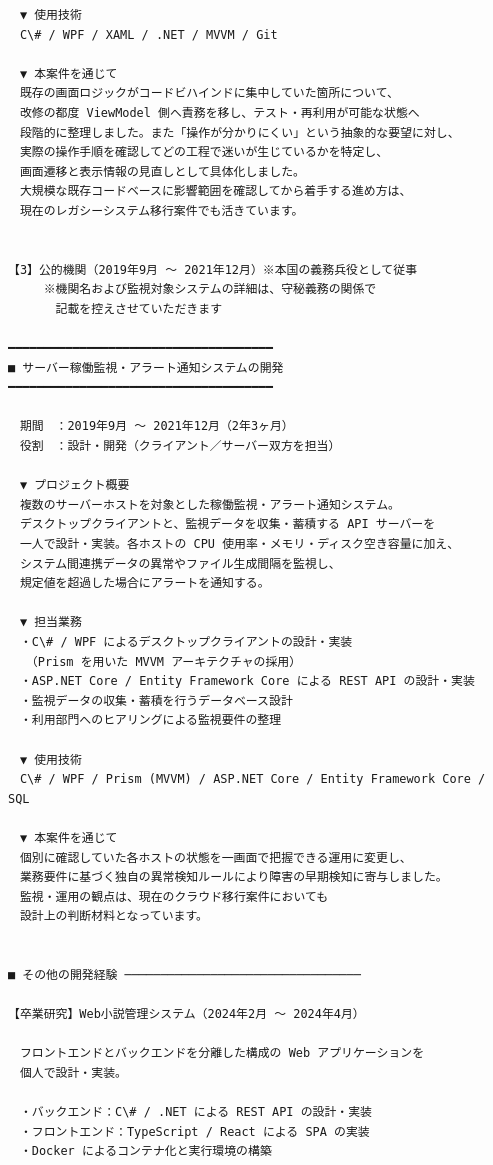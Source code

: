 \documentclass[paper=a4paper,fontsize=9.5pt,head_space=15mm,foot_space=15mm,gutter=18mm,fore_edge=18mm,baselineskip=15.5pt]{jlreq}
\begin{document}
\begin{Verbatim}[fontsize=\small,commandchars=\\\{\}]
　▼ 使用技術
　C\# / WPF / XAML / .NET / MVVM / Git

　▼ 本案件を通じて
　既存の画面ロジックがコードビハインドに集中していた箇所について、
　改修の都度 ViewModel 側へ責務を移し、テスト・再利用が可能な状態へ
　段階的に整理しました。また「操作が分かりにくい」という抽象的な要望に対し、
　実際の操作手順を確認してどの工程で迷いが生じているかを特定し、
　画面遷移と表示情報の見直しとして具体化しました。
　大規模な既存コードベースに影響範囲を確認してから着手する進め方は、
　現在のレガシーシステム移行案件でも活きています。


【3】公的機関（2019年9月 〜 2021年12月）※本国の義務兵役として従事
　　　※機関名および監視対象システムの詳細は、守秘義務の関係で
　　　　記載を控えさせていただきます

━━━━━━━━━━━━━━━━━━━━━━━━━━━━━━━━━━━━━
■ サーバー稼働監視・アラート通知システムの開発
━━━━━━━━━━━━━━━━━━━━━━━━━━━━━━━━━━━━━

　期間　：2019年9月 〜 2021年12月（2年3ヶ月）
　役割　：設計・開発（クライアント／サーバー双方を担当）

　▼ プロジェクト概要
　複数のサーバーホストを対象とした稼働監視・アラート通知システム。
　デスクトップクライアントと、監視データを収集・蓄積する API サーバーを
　一人で設計・実装。各ホストの CPU 使用率・メモリ・ディスク空き容量に加え、
　システム間連携データの異常やファイル生成間隔を監視し、
　規定値を超過した場合にアラートを通知する。

　▼ 担当業務
　・C\# / WPF によるデスクトップクライアントの設計・実装
　　（Prism を用いた MVVM アーキテクチャの採用）
　・ASP.NET Core / Entity Framework Core による REST API の設計・実装
　・監視データの収集・蓄積を行うデータベース設計
　・利用部門へのヒアリングによる監視要件の整理

　▼ 使用技術
　C\# / WPF / Prism (MVVM) / ASP.NET Core / Entity Framework Core / SQL

　▼ 本案件を通じて
　個別に確認していた各ホストの状態を一画面で把握できる運用に変更し、
　業務要件に基づく独自の異常検知ルールにより障害の早期検知に寄与しました。
　監視・運用の観点は、現在のクラウド移行案件においても
　設計上の判断材料となっています。


■ その他の開発経験 ─────────────────────────────────

【卒業研究】Web小説管理システム（2024年2月 〜 2024年4月）

　フロントエンドとバックエンドを分離した構成の Web アプリケーションを
　個人で設計・実装。

　・バックエンド：C\# / .NET による REST API の設計・実装
　・フロントエンド：TypeScript / React による SPA の実装
　・Docker によるコンテナ化と実行環境の構築


\end{Verbatim}
\end{document}
